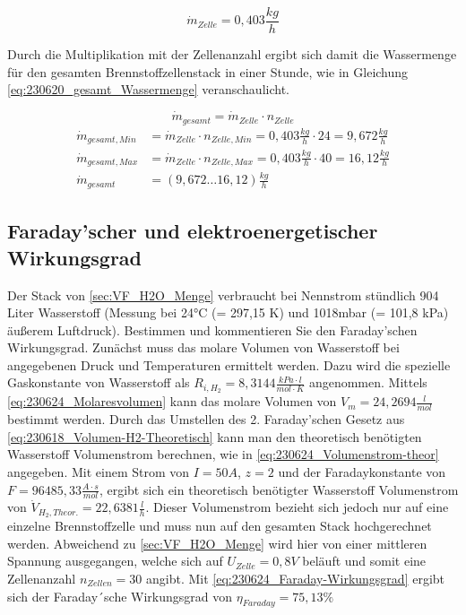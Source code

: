 $$\dot{m}_{Zelle} = 0,403 \frac{kg}{h}$$

Durch die Multiplikation mit der Zellenanzahl ergibt sich damit die Wassermenge für den gesamten Brennstoffzellenstack in einer Stunde, wie in Gleichung \autoref{eq:230620_gesamt_Wassermenge} veranschaulicht.

\begin{equation}
    \dot{m}_{gesamt} = \dot{m}_{Zelle} \cdot n_{Zelle}
    \label{eq:230620_gesamt_Wassermenge}
\end{equation}
\begin{align}
    \dot{m}_{gesamt,Min} &= \dot{m}_{Zelle} \cdot n_{Zelle,Min} = 0,403 \frac{kg}{h} \cdot 24 = 9,672 \frac{kg}{h} \nonumber\\
    \dot{m}_{gesamt,Max} &= \dot{m}_{Zelle} \cdot n_{Zelle,Max} = 0,403 \frac{kg}{h} \cdot 40 = 16,12 \frac{kg}{h} \nonumber\\
    \dot{m}_{gesamt} &= (9,672 \dots 16,12) \frac{kg}{h} \nonumber
\end{align}

\subsection{Faraday'scher und elektroenergetischer Wirkungsgrad}


Der Stack von \ref{sec:VF_H2O_Menge} verbraucht bei Nennstrom stündlich 904 Liter Wasserstoff (Messung bei 24°C (= 297,15 K) und 1018mbar (= 101,8 kPa) äußerem Luftdruck). 
Bestimmen und kommentieren Sie den Faraday'schen Wirkungsgrad.
Zunächst muss das molare Volumen von Wasserstoff bei angegebenen Druck und Temperaturen ermittelt werden.
Dazu wird die spezielle Gaskonstante von Wasserstoff als $R_{i,H_2} = 8,3144 \frac{kPa \cdot l}{mol \cdot K}$ \cite{Gaskonstante} angenommen.
Mittels \autoref{eq:230624_Molaresvolumen} kann das molare Volumen von $V_m = 24,2694 \frac{l}{mol}$ bestimmt werden.
Durch das Umstellen des 2. Faraday'schen Gesetz aus \autoref{eq:230618_Volumen-H2-Theoretisch} kann man den theoretisch benötigten Wasserstoff Volumenstrom berechnen, wie in \autoref{eq:230624_Volumenstrom-theor} angegeben.
Mit einem Strom von $I = 50A$, $z = 2$ und der Faradaykonstante von $F = 96485,33 \frac{A \cdot s}{mol}$, ergibt sich ein theoretisch benötigter Wasserstoff Volumenstrom von $\dot{V}_{H_2,Theor.} = 22,6381 \frac{l}{h}$.
Dieser Volumenstrom bezieht sich jedoch nur auf eine einzelne Brennstoffzelle und muss nun auf den gesamten Stack hochgerechnet werden.
Abweichend zu \autoref{sec:VF_H2O_Menge} wird hier von einer mittleren Spannung ausgegangen, welche sich auf $U_{Zelle} = 0,8V$ beläuft und somit eine Zellenanzahl $n_{Zellen} = 30$ angibt.
Mit \autoref{eq:230624_Faraday-Wirkungsgrad} ergibt sich der Faraday´sche Wirkungsgrad von $\eta_{Faraday} = 75,13 \%$


